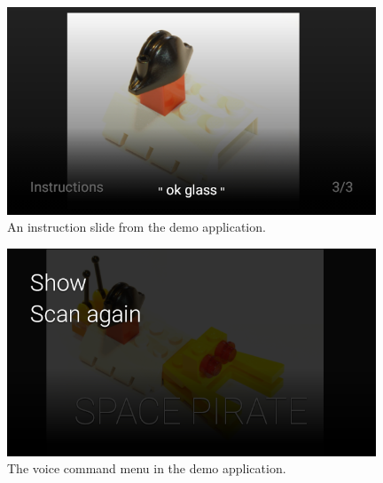 	\begin{figure}[H]%
		\centering
		\includegraphics[width=110mm]{images/demo/instructionImage}
		\caption{An instruction slide from the demo application.}
		\label{glassDemoQR}
	\end{figure}
	
	\begin{figure}[H]%
		\centering
		\includegraphics[width=110mm]{images/demo/voiceCommand1}
		\caption{The voice command menu in the demo application.}
		\label{glassDemoQR}
	\end{figure}

